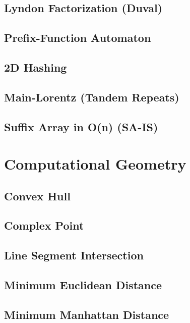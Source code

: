 \documentclass[10pt,letterpaper,landscape,twocolumn]{article}
\begin{document}
\subsection{Lyndon Factorization (Duval)}

\subsection{Prefix-Function Automaton}

\subsection{2D Hashing}

\subsection{Main-Lorentz (Tandem Repeats)}

\subsection{Suffix Array in O(n) (SA-IS)}


\section{Computational Geometry}
\subsection{Convex Hull}

\subsection{Complex Point}

\subsection{Line Segment Intersection}

\subsection{Minimum Euclidean Distance}

\subsection{Minimum Manhattan Distance}

\end{document}
